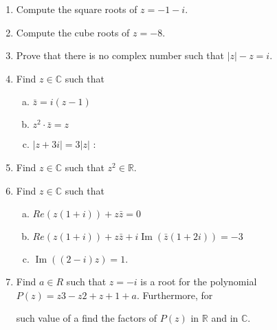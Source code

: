 \documentclass[a4paper,12pt]{article}
\begin{document}
\begin{enumerate}
\item Compute the square roots of $z = -1 - i$.

\item Compute the cube roots of $z = -8$.

\item Prove that there is no complex number such that $|z| - z = i$.

\item Find $z \in \mathbb{C}$ such that

\begin{multicols}{3}

\begin{enumerate}[(a)]

\item $\bar{z} = i(z - 1)$ 

\item $z^2 \cdot \bar{z}= z$ 

\item $|z + 3i| = 3|z|$ :

\end{enumerate}
\end{multicols}
\item Find $z \in\mathbb{C}$ such that $z^2 \in \mathbb{R}$.

\item Find $z \in \mathbb{C}$ such that
\begin{multicols}{2}
\begin{enumerate}[(a)]

\item $Re(z(1 + i)) + z\bar{z} = 0$

\item $Re(z(1 + i)) + z\bar{z}
+ i \operatorname{Im} (\bar{z}(1 + 2i)) = -3 $

\item $\operatorname{Im} ((2 - i)z) = 1.$

\end{enumerate}
\end{multicols}
\item  Find $a \in R$ such that $z = -i$ is a root for the polynomial $P(z) = z3 - z2 + z + 1 + a$. Furthermore, for

such value of a find the factors of $P(z)$ in $\mathbb{R}$ and in $\mathbb{C}$.

\end{enumerate}

\end{document}

